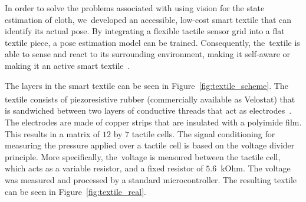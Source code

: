 \documentclass[\home/main.tex]{subfiles}
\begin{document}

In order to solve the problems associated with using vision for the state estimation of cloth, we~developed an accessible, low-cost smart textile that can identify its actual pose. By integrating a flexible tactile sensor grid into a flat textile piece, a pose estimation model can be trained. Consequently, the~textile is able to sense and react to its surrounding environment, making it self-aware or making it an active smart textile~\cite{Stoppa2014}.

The layers in the smart textile can be seen in Figure~\ref{fig:textile_scheme}. The textile consists of piezoresistive rubber (commercially available as Velostat\textsuperscript{\textregistered}) that is sandwiched between two layers of conductive threads that act as electrodes~\cite{Drimus2014}. The electrodes are made of copper strips that are insulated with a polyimide film. This results in a matrix of $12$ by $7$ tactile cells. The signal conditioning for measuring the pressure applied over a tactile cell is based on the voltage divider principle. More specifically, the~voltage is measured between the tactile cell, which acts as a variable resistor, and a fixed resistor of $5.6$~kOhm. The voltage was measured and processed by a standard microcontroller. The resulting textile can be seen in Figure~\ref{fig:textile_real}.
\end{document}
